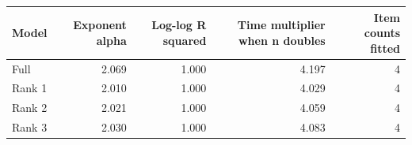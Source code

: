 \begin{tabular}{lrrrr}
\toprule
Model & Exponent alpha & Log-log R squared & Time multiplier when n doubles & Item counts fitted \\
\midrule
Full & 2.069 & 1.000 & 4.197 & 4 \\
Rank 1 & 2.010 & 1.000 & 4.029 & 4 \\
Rank 2 & 2.021 & 1.000 & 4.059 & 4 \\
Rank 3 & 2.030 & 1.000 & 4.083 & 4 \\
\bottomrule
\end{tabular}
